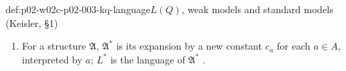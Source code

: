 \begin{hbdefinition}{def:p02-w02c-p02-003-kq-language}{\(L(Q)\), weak models and standard models (Keisler, \S1)}
\begin{enumerate}
      \((\mathfrak A,q)\), written \((\mathfrak A,q)\prec(\mathfrak B,r)\),
      iff \(A\subseteq B\) and for all formulas \(\varphi(x_1,\ldots,x_n)\)
      of \(L(Q)\) and \(a_1,\ldots,a_n\in A\),
      \((\mathfrak A,q)\models\varphi[a_1,\ldots,a_n]\) iff
      \((\mathfrak B,r)\models\varphi[a_1,\ldots,a_n]\).  A sequence
      \((\mathfrak A_\alpha,q_\alpha)\), \(\alpha<\gamma\), is an
      \emph{elementary chain} iff
      \((\mathfrak A_\alpha,q_\alpha)\prec(\mathfrak A_\beta,q_\beta)\) for
      \(\alpha<\beta<\gamma\); its \emph{union}
      \((\mathfrak A,q)=\bigcup_{\alpha<\gamma}(\mathfrak A_\alpha,q_\alpha)\)
      has \(\mathfrak A=\bigcup_{\alpha<\gamma}\mathfrak A_\alpha\) and
      \(q=\{S\subseteq A:\text{for some }\beta<\gamma,\ \beta\le\alpha<\gamma
      \text{ implies }S\cap A_\alpha\in q_\alpha\}\)
      \cite[\S2, p.~16]{Keisler1970}.
\item For a structure \(\mathfrak A\), \(\mathfrak A^{*}\) is its expansion
      by a new constant \(c_a\) for each \(a\in A\), interpreted by \(a\);
      \(L^{*}\) is the language of \(\mathfrak A^{*}\)
      \cite[\S2, p.~18]{Keisler1970}.
\end{enumerate}
\end{hbdefinition}

